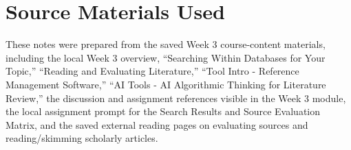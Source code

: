 \documentclass[11pt,letterpaper]{article}
\begin{document}
\section{Source Materials Used}

These notes were prepared from the saved Week 3 course-content materials, including the local Week 3 overview, ``Searching Within Databases for Your Topic,'' ``Reading and Evaluating Literature,'' ``Tool Intro - Reference Management Software,'' ``AI Tools - AI Algorithmic Thinking for Literature Review,'' the discussion and assignment references visible in the Week 3 module, the local assignment prompt for the Search Results and Source Evaluation Matrix, and the saved external reading pages on evaluating sources and reading/skimming scholarly articles.
\end{document}
